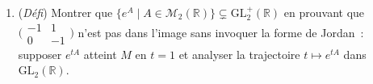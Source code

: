 \begin{mdframed}[style=exobar]
\begin{enumerate}
    \item (\textit{Défi}) Montrer que
          $\bigl\{e^A \mid A \in \mathcal{M}_2(\mathbb{R})\bigr\} \subsetneq
          \mathrm{GL}_2^+(\mathbb{R})$
          en prouvant que $\bigl(\begin{smallmatrix}-1&1\\0&-1\end{smallmatrix}\bigr)$
          n'est pas dans l'image sans invoquer la forme de Jordan~:
          supposer $e^{tA}$ atteint $M$ en $t=1$ et analyser la trajectoire
          $t \mapsto e^{tA}$ dans $\mathrm{GL}_2(\mathbb{R})$.
  \end{enumerate}
\end{mdframed}

